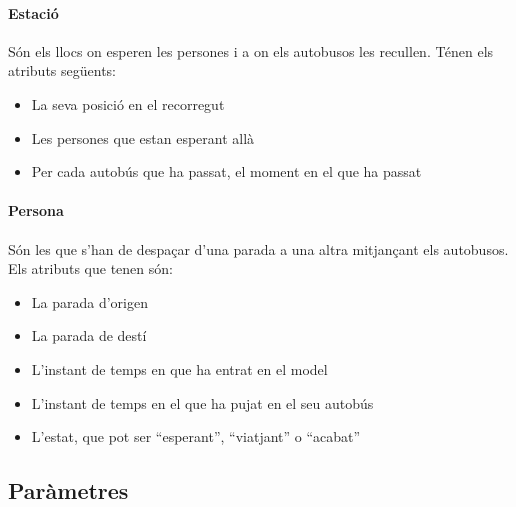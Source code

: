\documentclass[a4paper,10pt]{article}
\begin{document}
\paragraph{Estació}
Són els llocs on esperen les persones i a on els autobusos les recullen. Ténen els atributs següents:
\begin{itemize}
 \item La seva posició en el recorregut
 \item Les persones que estan esperant allà
 \item Per cada autobús que ha passat, el moment en el que ha passat
\end{itemize}

\paragraph{Persona}
Són les que s'han de despaçar d'una parada a una altra mitjançant els autobusos. Els atributs que tenen són:
\begin{itemize}
 \item La parada d'origen
 \item La parada de destí
 \item L'instant de temps en que ha entrat en el model
 \item L'instant de temps en el que ha pujat en el seu autobús
 \item L'estat, que pot ser ``esperant'', ``viatjant'' o ``acabat''
\end{itemize}


\subsection{Paràmetres}
\end{document}
